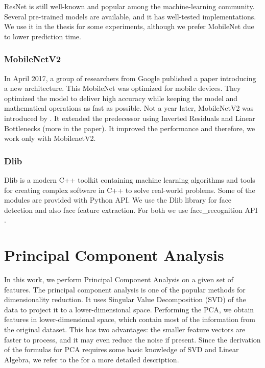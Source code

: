 ResNet is still well-known and popular among the machine-learning community. Several pre-trained models are available, and it has well-tested implementations. We use it in the thesis for some experiments, although we prefer MobileNet due to lower prediction time.

\subsubsection*{MobileNetV2}

In April 2017, a group of researchers from Google published a paper \citep{mobilenet} introducing a new architecture. This MobileNet was optimized for mobile devices. They optimized the model to deliver high accuracy while keeping the model and mathematical operations as fast as possible. Not a year later, MobileNetV2 was introduced by \cite{mobilenetv2}. It extended the predecessor using Inverted Residuals and Linear Bottlenecks (more in the paper). It improved the performance and therefore, we work only with MobilenetV2.


\subsubsection{Dlib}
Dlib \citep{king2009dlib} is a modern C++ toolkit containing machine learning algorithms and tools for creating complex software in C++ to solve real-world problems. Some of the modules are provided with Python API. We use the Dlib library for face detection and also face feature extraction. For both we use face\_recognition API \citep{geitgey2016machine}. 


\section{Principal Component Analysis}

In this work, we perform Principal Component Analysis on a given set of features. The principal component analysis is one of the popular methods for dimensionality reduction. It uses Singular Value Decomposition (SVD) of the data to project it to a lower-dimensional space. Performing the PCA, we obtain features in lower-dimensional space, which contain most of the information from the original dataset. This has two advantages: the smaller feature vectors are faster to process, and it may even reduce the noise if present. Since the derivation of the formulas for PCA requires some basic knowledge of SVD and Linear Algebra, we refer to the \cite{alpaydin2020introduction} for a more detailed description.

